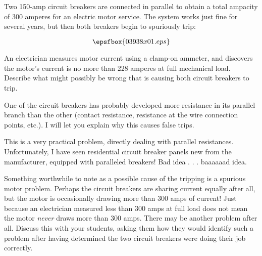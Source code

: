 

Two 150-amp circuit breakers are connected in parallel to obtain a total ampacity of 300 amperes for an electric motor service.  The system works just fine for several years, but then both breakers begin to spuriously trip:

$$\epsfbox{03938x01.eps}$$

An electrician measures motor current using a clamp-on ammeter, and discovers the motor's current is no more than 228 amperes at full mechanical load.  Describe what might possibly be wrong that is causing both circuit breakers to trip.







One of the circuit breakers has probably developed more resistance in its parallel branch than the other (contact resistance, resistance at the wire connection points, etc.).  I will let you explain why this causes false trips.







This is a very practical problem, directly dealing with parallel resistances.  Unfortunately, I have seen residential circuit breaker panels new from the manufacturer, equipped with paralleled breakers!  Bad idea . . . baaaaaad idea.

Something worthwhile to note as a possible cause of the tripping is a spurious motor problem.  Perhaps the circuit breakers are sharing current equally after all, but the motor is occasionally drawing more than 300 amps of current!  Just because an electrician measured less than 300 amps at full load does not mean the motor {\it never} draws more than 300 amps.  There may be another problem after all.  Discuss this with your students, asking them how they would identify such a problem after having determined the two circuit breakers were doing their job correctly.




